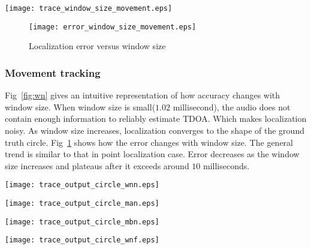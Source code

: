 \begin{figure*}[]
\centering
  \texttt{[image: trace\_window\_size\_movement.eps]}
\caption{Localization quality versus window size}\label{fig:wn}
\label{fig:trace_win_circle}
\end{figure*}

\begin{figure}[]
\centering
\texttt{[image: error\_window\_size\_movement.eps]}
\caption{Localization error versus window size}
\label{fig:err_win_circle}
\end{figure}

\subsubsection{Movement tracking}

Fig~\ref{fig:wn} gives an intuitive representation of how accuracy changes with window size. When window size is small($1.02$ millisecond), the audio does not contain enough information to reliably estimate TDOA. Which makes localization noisy. As window size increases, localization converges to the shape of the ground truth circle. Fig~\ref{fig:err_win_circle} shows how the error changes with window size. The general trend is similar to that in point localization case. Error decreases as the window size increases and plateaus after it exceeds around $10$ milliseconds.

\begin{figure*}[]
\centering
\texttt{[image: trace\_output\_circle\_wnn.eps]}
\caption{white noise ($10$ cm per second)}
\label{fig:circle_wnn}
\end{figure*}

\begin{figure*}[]
\centering
\texttt{[image: trace\_output\_circle\_man.eps]}
\caption{music A ($10$ cm per second)}
\label{fig:circle_musican}
\end{figure*}

\begin{figure*}[]
\centering
\texttt{[image: trace\_output\_circle\_mbn.eps]}
\caption{music B ($10$ cm per second)}
\label{fig:circle_musicbn}
\end{figure*}

\begin{figure*}[]
\centering
\texttt{[image: trace\_output\_circle\_wnf.eps]}
\caption{white noise ($20$ cm per second)}
\label{fig:circle_wnf}
\end{figure*}

